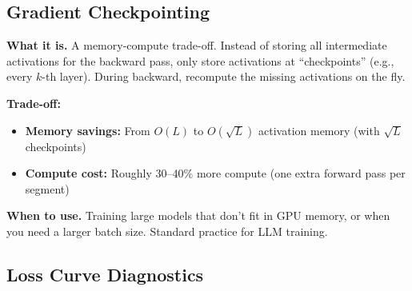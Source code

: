 \subsection{Gradient Checkpointing}

\textbf{What it is.} A memory-compute trade-off. Instead of storing all intermediate activations for the backward pass, only store activations at ``checkpoints'' (e.g., every $k$-th layer). During backward, recompute the missing activations on the fly.

\textbf{Trade-off:}
\begin{itemize}
    \item \textbf{Memory savings:} From $O(L)$ to $O(\sqrt{L})$ activation memory (with $\sqrt{L}$ checkpoints)
    \item \textbf{Compute cost:} Roughly 30--40\% more compute (one extra forward pass per segment)
\end{itemize}

\textbf{When to use.} Training large models that don't fit in GPU memory, or when you need a larger batch size. Standard practice for LLM training.

\subsection{Loss Curve Diagnostics}

